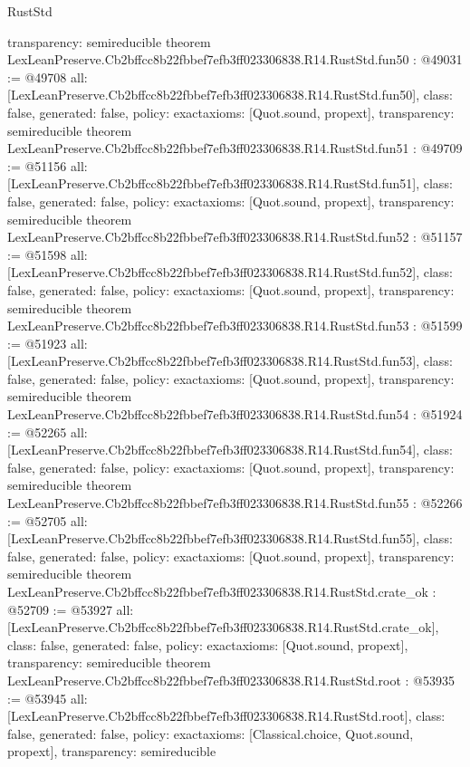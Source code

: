 \begin{lexlean}{RustStd}
\begin{coremodule}
{  transparency: semireducible
}
theorem LexLeanPreserve.Cb2bffcc8b22fbbef7efb3ff023306838.R14.RustStd.fun50 : @49031 := @49708 {
  all: [LexLeanPreserve.Cb2bffcc8b22fbbef7efb3ff023306838.R14.RustStd.fun50],
  class: false,
  generated: false,
  policy: exact{axioms: [Quot.sound, propext]},
  transparency: semireducible
}
theorem LexLeanPreserve.Cb2bffcc8b22fbbef7efb3ff023306838.R14.RustStd.fun51 : @49709 := @51156 {
  all: [LexLeanPreserve.Cb2bffcc8b22fbbef7efb3ff023306838.R14.RustStd.fun51],
  class: false,
  generated: false,
  policy: exact{axioms: [Quot.sound, propext]},
  transparency: semireducible
}
theorem LexLeanPreserve.Cb2bffcc8b22fbbef7efb3ff023306838.R14.RustStd.fun52 : @51157 := @51598 {
  all: [LexLeanPreserve.Cb2bffcc8b22fbbef7efb3ff023306838.R14.RustStd.fun52],
  class: false,
  generated: false,
  policy: exact{axioms: [Quot.sound, propext]},
  transparency: semireducible
}
theorem LexLeanPreserve.Cb2bffcc8b22fbbef7efb3ff023306838.R14.RustStd.fun53 : @51599 := @51923 {
  all: [LexLeanPreserve.Cb2bffcc8b22fbbef7efb3ff023306838.R14.RustStd.fun53],
  class: false,
  generated: false,
  policy: exact{axioms: [Quot.sound, propext]},
  transparency: semireducible
}
theorem LexLeanPreserve.Cb2bffcc8b22fbbef7efb3ff023306838.R14.RustStd.fun54 : @51924 := @52265 {
  all: [LexLeanPreserve.Cb2bffcc8b22fbbef7efb3ff023306838.R14.RustStd.fun54],
  class: false,
  generated: false,
  policy: exact{axioms: [Quot.sound, propext]},
  transparency: semireducible
}
theorem LexLeanPreserve.Cb2bffcc8b22fbbef7efb3ff023306838.R14.RustStd.fun55 : @52266 := @52705 {
  all: [LexLeanPreserve.Cb2bffcc8b22fbbef7efb3ff023306838.R14.RustStd.fun55],
  class: false,
  generated: false,
  policy: exact{axioms: [Quot.sound, propext]},
  transparency: semireducible
}
theorem LexLeanPreserve.Cb2bffcc8b22fbbef7efb3ff023306838.R14.RustStd.crate_ok : @52709 := @53927 {
  all: [LexLeanPreserve.Cb2bffcc8b22fbbef7efb3ff023306838.R14.RustStd.crate_ok],
  class: false,
  generated: false,
  policy: exact{axioms: [Quot.sound, propext]},
  transparency: semireducible
}
theorem LexLeanPreserve.Cb2bffcc8b22fbbef7efb3ff023306838.R14.RustStd.root : @53935 := @53945 {
  all: [LexLeanPreserve.Cb2bffcc8b22fbbef7efb3ff023306838.R14.RustStd.root],
  class: false,
  generated: false,
  policy: exact{axioms: [Classical.choice, Quot.sound, propext]},
  transparency: semireducible
}


\end{coremodule}
\end{lexlean}
